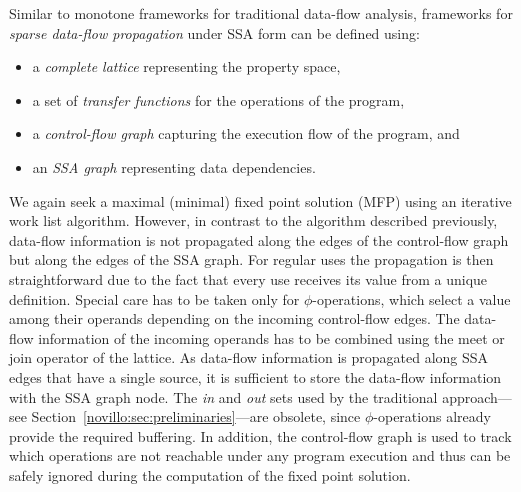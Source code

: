 Similar to monotone frameworks for traditional data-flow analysis, frameworks
for \emph{sparse data-flow propagation} 
under SSA form can be defined using:
\begin{itemize}
  \item a \emph{complete lattice} representing the property space,
  \item a set of \emph{transfer functions} for the operations of the program,
  \item a \emph{control-flow graph} capturing the execution flow of the program, and
  \item an \emph{SSA graph} representing data dependencies.
\end{itemize}
We again seek a maximal (minimal) fixed point solution (MFP) using an iterative
work list
algorithm. However, in contrast to the algorithm described previously, data-flow
information is not propagated along the edges of the control-flow graph but
along the edges of the SSA graph. For regular uses the propagation is then
straightforward due
to the fact that every use receives its value from a unique definition. Special
care has to be taken only for $\phi$-operations, which select a value among
their operands depending on the incoming control-flow edges. The data-flow
information of the
incoming operands has to be combined using the meet or join operator of the
lattice. As data-flow information is propagated along SSA edges that have a
single source, it is sufficient to store the data-flow information with the SSA
graph
node. The \emph{in} and \emph{out} sets used by the traditional approach---see
Section~\ref{novillo:sec:preliminaries}---are obsolete, since
$\phi$-operations already provide the required buffering.
In addition, the
control-flow graph is used to track which operations are not reachable under any
program execution and thus can be safely ignored during the computation of the
fixed point solution.
\medskip


